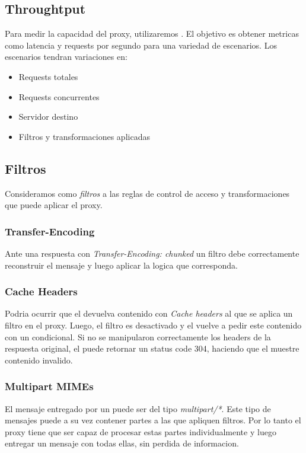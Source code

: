 \documentclass[11pt,a4paper,titlepage]{article}
\begin{document}
\subsection{Throughtput}
Para medir la capacidad del proxy, utilizaremos .
El objetivo es obtener metricas como latencia y requests por segundo para una variedad de escenarios.
Los escenarios tendran variaciones en: 
\begin{itemize}
    \item Requests totales
    \item Requests concurrentes
    \item Servidor destino
    \item Filtros y transformaciones aplicadas
\end{itemize}

\subsection{Filtros}
Consideramos como \textit{filtros} a las reglas de control de acceso y transformaciones que puede aplicar el proxy.

\subsubsection{Transfer-Encoding}
Ante una respuesta con \textit{Transfer-Encoding: chunked} un filtro debe correctamente reconstruir el mensaje y luego aplicar la logica que corresponda.

\subsubsection{Cache Headers}
Podria ocurrir que el \os devuelva contenido con \textit{Cache headers} al que se aplica un filtro en el proxy.
Luego, el filtro es desactivado y el \ua vuelve a pedir este contenido con un  condicional.
Si no se manipularon correctamente los headers de la respuesta original, el \os puede retornar un status code 304, haciendo que el \ua muestre contenido invalido.

\subsubsection{Multipart MIMEs}
El mensaje entregado por un \os puede ser del tipo \textit{multipart/*}.
Este tipo de mensajes puede a su vez contener partes a las que apliquen filtros.
Por lo tanto el proxy tiene que ser capaz de procesar estas partes individualmente y luego entregar un mensaje con todas ellas, sin perdida de informacion.

\end{document}
